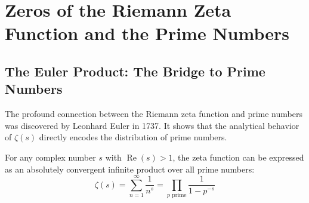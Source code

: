 \documentclass[a4paper]{article}
\begin{document}
\section{Zeros of the Riemann Zeta Function and the Prime Numbers}\label{zf:sec:riemann-hypothesis}

\subsection{The Euler Product: The Bridge to Prime Numbers}\label{zf:subsec:euler-product}

The profound connection between the Riemann zeta function and prime numbers was discovered by Leonhard Euler in 1737. It shows that the analytical behavior of $\zeta(s)$ directly encodes the distribution of prime numbers.

\begin{theorem}\label{zf:thm:euler-product}
For any complex number $s$ with $\operatorname{Re}(s) > 1$, the zeta function can be expressed as an absolutely convergent infinite product over all prime numbers:
\begin{equation}
    \label{zf:eq:euler-product}
    \boxed{
        \zeta(s) = \sum_{n=1}^{\infty} \frac{1}{n^s} = \prod_{p \text{ prime}} \frac{1}{1 - p^{-s}}
    }
\end{equation}
\end{theorem}
\end{document}
